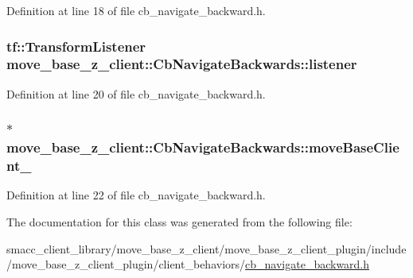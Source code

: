 Definition at line 18 of file cb\+\_\+navigate\+\_\+backward.\+h.

\subsubsection[{\texorpdfstring{listener}{listener}}]{\setlength{\rightskip}{0pt plus 5cm}tf\+::\+Transform\+Listener move\+\_\+base\+\_\+z\+\_\+client\+::\+Cb\+Navigate\+Backwards\+::listener}\hypertarget{classmove__base__z__client_1_1CbNavigateBackwards_a13939ba95a738b73e0e26f215791d675}{}\label{classmove__base__z__client_1_1CbNavigateBackwards_a13939ba95a738b73e0e26f215791d675}


Definition at line 20 of file cb\+\_\+navigate\+\_\+backward.\+h.

\subsubsection[{\texorpdfstring{move\+Base\+Client\+\_\+}{moveBaseClient_}}]{$\ast$ move\+\_\+base\+\_\+z\+\_\+client\+::\+Cb\+Navigate\+Backwards\+::move\+Base\+Client\+\_\+}\hypertarget{classmove__base__z__client_1_1CbNavigateBackwards_ac94348112821680532527fa006651a6c}{}\label{classmove__base__z__client_1_1CbNavigateBackwards_ac94348112821680532527fa006651a6c}


Definition at line 22 of file cb\+\_\+navigate\+\_\+backward.\+h.



The documentation for this class was generated from the following file\+:\begin{DoxyCompactItemize}
\item 
smacc\+\_\+client\+\_\+library/move\+\_\+base\+\_\+z\+\_\+client/move\+\_\+base\+\_\+z\+\_\+client\+\_\+plugin/include/move\+\_\+base\+\_\+z\+\_\+client\+\_\+plugin/client\+\_\+behaviors/\hyperlink{smacc__client__library_2move__base__z__client_2move__base__z__client__plugin_2include_2move__basef18dba82c6c9ec751438c97ecb125e5}{cb\+\_\+navigate\+\_\+backward.\+h}\end{DoxyCompactItemize}
